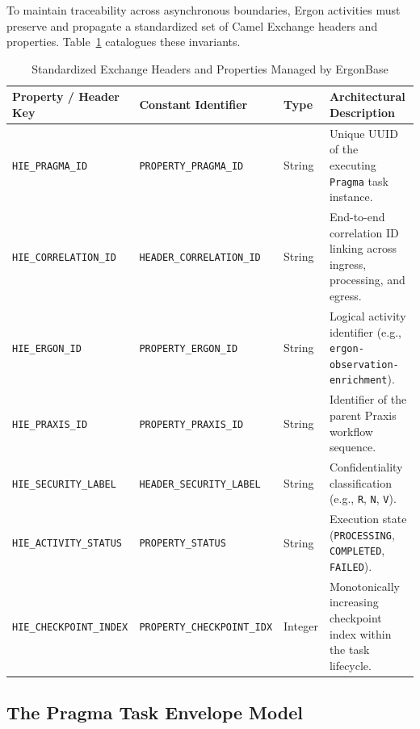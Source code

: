 To maintain traceability across asynchronous boundaries, Ergon activities must preserve and propagate a standardized set of Camel Exchange headers and properties. Table~\ref{tab:ergon_exchange_properties} catalogues these invariants.

\begin{table}[htbp]
\centering
\small
\begin{tabularx}{\textwidth}{l p{4.0cm} l X}
\toprule
\textbf{Property / Header Key} & \textbf{Constant Identifier} & \textbf{Type} & \textbf{Architectural Description} \\
\midrule
\texttt{HIE\_PRAGMA\_ID} & \texttt{PROPERTY\_PRAGMA\_ID} & String & Unique UUID of the executing \texttt{Pragma} task instance. \\
\texttt{HIE\_CORRELATION\_ID} & \texttt{HEADER\_CORRELATION\_ID} & String & End-to-end correlation ID linking across ingress, processing, and egress. \\
\texttt{HIE\_ERGON\_ID} & \texttt{PROPERTY\_ERGON\_ID} & String & Logical activity identifier (e.g., \texttt{ergon-observation-enrichment}). \\
\texttt{HIE\_PRAXIS\_ID} & \texttt{PROPERTY\_PRAXIS\_ID} & String & Identifier of the parent Praxis workflow sequence. \\
\texttt{HIE\_SECURITY\_LABEL} & \texttt{HEADER\_SECURITY\_LABEL} & String & Confidentiality classification (e.g., \texttt{R}, \texttt{N}, \texttt{V}). \\
\texttt{HIE\_ACTIVITY\_STATUS} & \texttt{PROPERTY\_STATUS} & String & Execution state (\texttt{PROCESSING}, \texttt{COMPLETED}, \texttt{FAILED}). \\
\texttt{HIE\_CHECKPOINT\_INDEX} & \texttt{PROPERTY\_CHECKPOINT\_IDX} & Integer & Monotonically increasing checkpoint index within the task lifecycle. \\
\bottomrule
\end{tabularx}
\caption{Standardized Exchange Headers and Properties Managed by ErgonBase}
\label{tab:ergon_exchange_properties}
\end{table}

\subsection{The Pragma Task Envelope Model}

